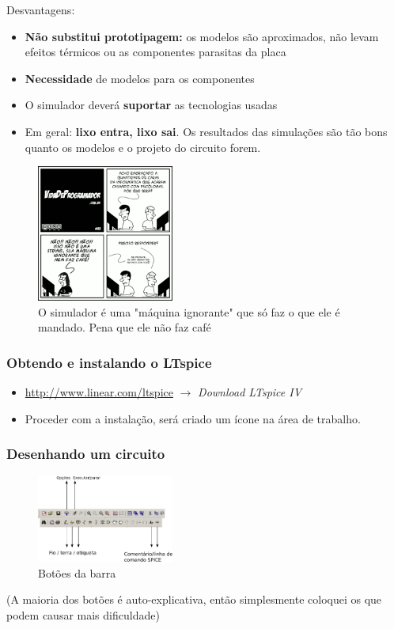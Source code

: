 \documentclass{beamer}
\begin{document}
\begin{frame} %
Desvantagens:
\begin{itemize}
\item{\textbf{Não substitui prototipagem:} os modelos são aproximados, não levam efeitos térmicos ou as componentes parasitas da placa}
\item{\textbf{Necessidade} de modelos para os componentes}
\item{O simulador deverá \textbf{suportar} as tecnologias usadas}
\item{Em geral: \textbf{lixo entra, lixo sai}. Os resultados das simulações são tão bons quanto os modelos e o projeto do circuito forem.}
\end{itemize}
\end{frame}

\begin{frame}

\begin{figure}[htb]
\includegraphics[width=170px]{images/tirinha33}
\caption{O simulador é uma "máquina ignorante" que só faz o que ele é mandado. Pena que ele não faz café}
\label{fig:lixoentrasai}
\end{figure} 

\end{frame} %

\begin{frame} %
\frametitle{Obtendo e instalando o LTspice}
\begin{itemize}
\item \url{http://www.linear.com/ltspice} $\rightarrow$ \textit{Download LTspice IV}
\item Proceder com a instalação, será criado um ícone na área de trabalho.
\end{itemize}
\end{frame}

\begin{frame} %
\frametitle{Desenhando um circuito}
\begin{figure}[htb]
\includegraphics[width=170px]{images/botoes_barra}
\caption{Botões da barra}
\label{fig:botoesbarra}
\end{figure}
(A maioria dos botões é auto-explicativa, então simplesmente coloquei os que podem causar mais dificuldade)
\end{frame}
\end{document}
